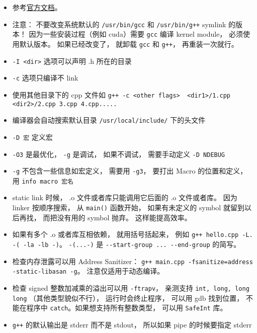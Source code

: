 
\begin{issues}
\issueDraft
\end{issues}


\begin{itemize}
\item 参考\href{https://gcc.gnu.org/onlinedocs/gcc-12.2.0/gcc/}{官方文档}。
\item 注意： 不要改变系统默认的 \verb`/usr/bin/gcc` 和 \verb`/usr/bin/g++` symlink 的版本！ 因为一些安装过程（例如 cuda）需要 \verb`gcc` 编译 kernel module， 必须使用默认版本。 如果已经改变了， 就卸载 \verb`gcc` 和 \verb`g++`， 再重装一次就行。
\item \verb`-I <dir>` 选项可以声明 .h 所在的目录
\item \verb`-c` 选项只编译不 link
\item 使用其他目录下的 cpp 文件如 \verb`g++ -c <other flags>  <dir1>/1.cpp <dir2>/2.cpp 3.cpp 4.cpp.....`
\item 编译器会自动搜索默认目录 \verb`/usr/local/include/` 下的头文件
\item \verb`-D 宏` 定义宏
\item \verb`-O3` 是最优化， \verb`-g` 是调试， 如果不调试， 需要手动定义 \verb`-D NDEBUG`
\item \verb`-g` 不包含一些信息如宏定义， 需要用 \verb`-g3`， 要打出 Macro 的位置和定义， 用 \verb`info macro 宏名`
\item static link 时候， .o 文件或者库只能调用它后面的 .o 文件或者库。 因为 linker 按顺序搜索， 从 \verb`main()` 函数开始， 如果有未定义的 symbol 就留到以后再找， 而把没有用的 symbol 抛弃。 这样能提高效率。
\item 如果有多个 .o 或者库互相依赖， 就用括号括起来， 例如 \verb`g++ hello.cpp -L. -( -la -lb -)`。 \verb`-(...-)` 是 \verb`--start-group ... --end-group` 的简写。
\item 检查内存泄露可以用 Address Sanitizer： \verb`g++ main.cpp -fsanitize=address -static-libasan -g`。 注意仅适用于动态编译。
\item 检查 signed 整数加减乘的溢出可以用 \verb`-ftrapv`， 亲测支持 \verb`int, long, long long` （其他类型貌似不行）， 运行时会终止程序， 可以用 gdb 找到位置， 不能在程序中 \verb`catch`。如果想支持所有整数类型， 可以用 \verb`SafeInt` 库。
\item \verb`g++` 的默认输出是 stderr 而不是 stdout， 所以如果 pipe 的时候要指定 stderr
\end{itemize}

